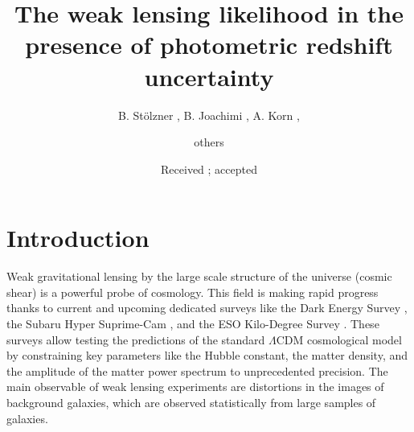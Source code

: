 \documentclass{aa}
\begin{document}
 

   \title{The weak lensing likelihood in the presence of photometric redshift uncertainty}


   \author{B. St\"olzner
             ,
             B. Joachimi
             ,
             A. Korn
             ,
          \and
          others
          }


   \date{Received ; accepted }



   \maketitle
%

\section{Introduction}
Weak gravitational lensing by the large scale structure of the universe (cosmic shear) is a powerful probe of cosmology. This field is making rapid progress thanks to current and upcoming dedicated surveys like the Dark Energy Survey \cite[DES; ][]{DES1, DES2}, the Subaru Hyper Suprime-Cam \cite[HSC; ][]{HSC1, HSC2} , and the ESO Kilo-Degree Survey \cite[KiDS; ][]{2015MNRAS.454.3500K, hildebrandt18}. These surveys allow testing the predictions of the standard $\Lambda$CDM cosmological model by constraining key parameters like the Hubble constant, the matter density, and the amplitude of the matter power spectrum to unprecedented precision. The main observable of weak lensing experiments are distortions in the images of background galaxies, which are observed statistically from large samples of galaxies.
\end{document}
